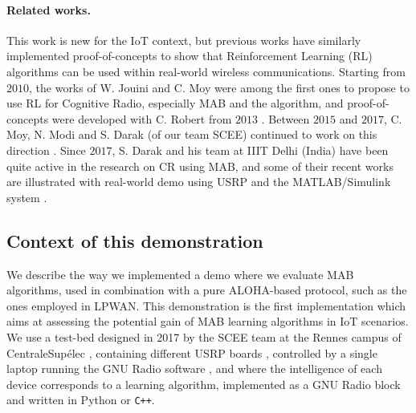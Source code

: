 \paragraph{Related works.}
%
This work is new for the IoT context, but previous works have similarly implemented proof-of-concepts to show that Reinforcement Learning (RL) algorithms can be used within real-world wireless communications.
Starting from $2010$, the works of W. Jouini and C. Moy \cite{Jouini09,Jouini10,Jouini12} were among the first ones to propose to use RL for Cognitive Radio, especially MAB and the \UCB{} algorithm, and proof-of-concepts were developed with C. Robert from $2013$ \cite{RobertSDR2014,MoyWSR2014}.
Between $2015$ and $2017$, C. Moy, N. Modi and S. Darak (of our team SCEE) continued to work on this direction \cite{darak2016bayesian,Darak16,modiDemo2016,kumar2016two}.
Since $2017$, S. Darak and his team at IIIT Delhi (India) have been quite active in the research on CR using MAB, and some of their recent works are illustrated with real-world demo using USRP and the MATLAB/Simulink system
\cite{KumarYadav2018,SawantKumar2018,JoshiKumar2018}.


\subsection{Context of this demonstration}
\label{sub:42:motivation}

We describe the way we implemented a demo where we evaluate MAB algorithms, used in combination with a pure ALOHA-based protocol, such as the ones employed in LPWAN.
This demonstration is the first implementation which aims at assessing the potential gain of MAB learning algorithms in IoT scenarios.
%
We use a test-bed designed in 2017 by the SCEE team at the Rennes campus of CentraleSupélec \cite[Appendix~3]{Bodinier17}, containing different USRP boards \cite{USRPDocumentation}, controlled by a single laptop running the GNU Radio software \cite{GNURadioDocumentation},
and where the intelligence of each device corresponds to a learning algorithm, implemented as a GNU Radio block \cite{GNURadioCompanionDocumentation} and written in Python or \texttt{C++}.

